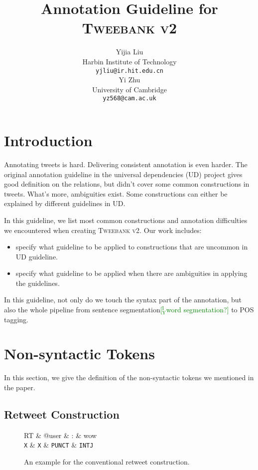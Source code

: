 \documentclass[11pt,a4paper]{article}
\title{Annotation Guideline for \textsc{Tweebank v2}}
\author{Yijia Liu \\
	Harbin Institute of Technology \\
	{\tt yjliu@ir.hit.edu.cn} \\\And
	Yi Zhu \\
	University of Cambridge \\
	{\tt yz568@cam.ac.uk} \\\AND
}
\date{}
\newcommand{\yicomment}[1]{\textcolor{green}{[$_\mathrm{Y}^\mathrm{I}$#1]}}
\begin{document}
\maketitle

\section{Introduction}
Annotating tweets is hard. 
Delivering consistent annotation is even harder.
The original annotation guideline in the universal dependencies (UD) project
gives good definition on the relations, but didn't cover some common
constructions in tweets.
What's more, ambiguities exist. 
Some constructions can either be explained by different guidelines in UD.

In this guideline, we list most common constructions
and annotation difficulties we encountered when creating \textsc{Tweebank v2}.
Our work includes:
\begin{itemize}
	\item specify what guideline to be applied to constructions that are
	uncommon in UD guideline.
	\item specify what guideline to be applied when there are ambiguities in
	applying the guidelines.
\end{itemize}

In this guideline, not only do we touch the syntax part of the annotation,
but also the whole pipeline from sentence segmentation\yicomment{word segmentation?} to POS tagging. 
\section{Non-syntactic Tokens}

In this section, we give the definition of the non-syntactic tokens
we mentioned in the paper.

\subsection{Retweet Construction}

\begin{figure}[t]
	\centering
	\small
	\begin{dependency}[edge slant=2, text only label, label style=above]
		\begin{deptext}
			RT \& @user \& : \& wow \\
			\texttt{X} \& \texttt{X} \& \texttt{PUNCT} \& \texttt{INTJ} \\
		\end{deptext}
	\end{dependency}
	\caption{An example for the conventional retweet construction.}\label{fig:rt}
\end{figure}
\end{document}
